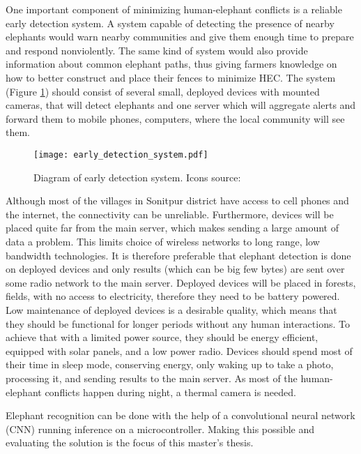 One important component of minimizing human-elephant conflicts is a reliable early detection system. 
A system capable of detecting the presence of nearby elephants would warn nearby communities and give them enough time to prepare and respond nonviolently.
The same kind of system would also provide information about common elephant paths, thus giving farmers knowledge on how to better construct and place their fences to minimize HEC.
The system (Figure \ref{early_detection_system_diagram}) should consist of several small, deployed devices with mounted cameras, that will detect elephants and one server which will aggregate alerts and forward them to mobile phones, computers, where the local community will see them.

\begin{figure}[ht]
        \centering
        \texttt{[image: early\_detection\_system.pdf]} 
        \caption[Diagram of early detection system.]{Diagram of early detection system. Icons source:\cite{icons}}
        \label{early_detection_system_diagram}
\end{figure}

Although most of the villages in Sonitpur district have access to cell phones and the internet, the connectivity can be unreliable\cite{wildlabs-elephants}. 
Furthermore, devices will be placed quite far from the main server, which makes sending a large amount of data a problem. 
This limits choice of wireless networks to long range, low bandwidth technologies.
It is therefore preferable that elephant detection is done on deployed devices and only results (which can be big few bytes) are sent over some radio network to the main server.
Deployed devices will be placed in forests, fields, with no access to electricity, therefore they need to be battery powered.
Low maintenance of deployed devices is a desirable quality, which means that they should be functional for longer periods without any human interactions.
To achieve that with a limited power source, they should be energy efficient, equipped with solar panels, and a low power radio.
Devices should spend most of their time in sleep mode, conserving energy, only waking up to take a photo, processing it, and sending results to the main server.
As most of the human-elephant conflicts happen during night\cite{wildlabs-elephants}, a thermal camera is needed.

Elephant recognition can be done with the help of a convolutional neural network (CNN) running inference on a microcontroller. 
Making this possible and evaluating the solution is the focus of this master's thesis.


